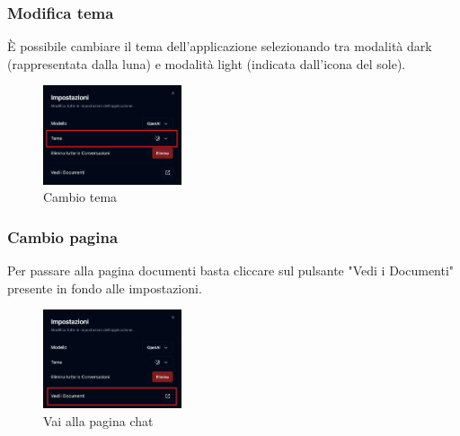 \newpage
\subsubsection{Modifica tema}
È possibile cambiare il tema dell'applicazione selezionando tra modalità dark (rappresentata dalla luna) e modalità light (indicata dall'icona del sole).
\begin{figure}[h!]
    \centering
    \includegraphics[width=0.364\textwidth]{settingchattheme.png}
    \caption{Cambio tema}\label{fig:settingchattheme}
\end{figure}
\subsubsection{Cambio pagina}
Per passare alla pagina documenti basta cliccare sul pulsante "Vedi i Documenti" presente in fondo alle impostazioni.
\begin{figure}[h!]
    \centering
    \includegraphics[width=0.364\textwidth]{settingchatchange.png}
    \caption{Vai alla pagina chat}\label{fig:changepage}
\end{figure}